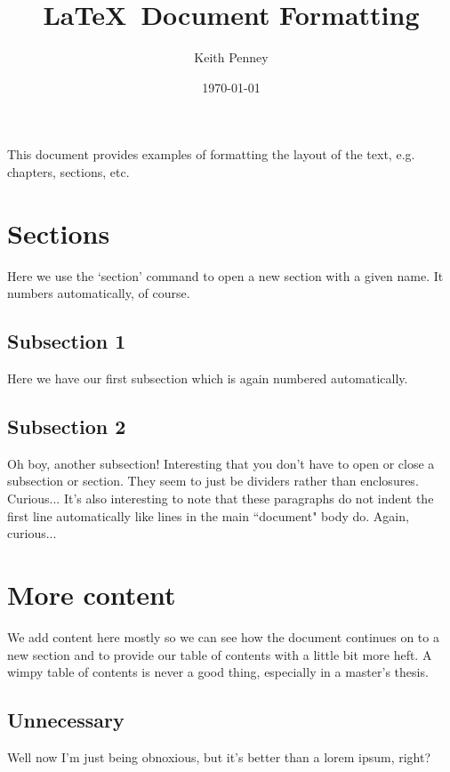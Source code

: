 \documentclass{article}
\begin{document}
\tableofcontents %

\title{\LaTeX \ Document Formatting} %
\author{Keith Penney}
\date{\today} %
\maketitle %

This document provides examples of formatting the layout of the text, e.g. chapters, sections, etc.

\section{Sections}
Here we use the `section' command to open a new section with a given name.  It numbers automatically, of course.

	\subsection{Subsection 1}Here we have our first subsection which is again numbered automatically.  %
	\subsection{Subsection 2}Oh boy, another subsection!  Interesting that you don't have to open or close a subsection or section.  They seem to just be dividers rather than enclosures. Curious... It's also interesting to note that these paragraphs do not indent the first line automatically like lines in the main ``document" body do.  Again, curious... 

\section{More content}
We add content here mostly so we can see how the document continues on to a new section and to provide our table of contents with a little bit more heft.  A wimpy table of contents is never a good thing, especially in a master's thesis.
\subsection{Unnecessary}Well now I'm just being obnoxious, but it's better than a lorem ipsum, right?
\end{document}
